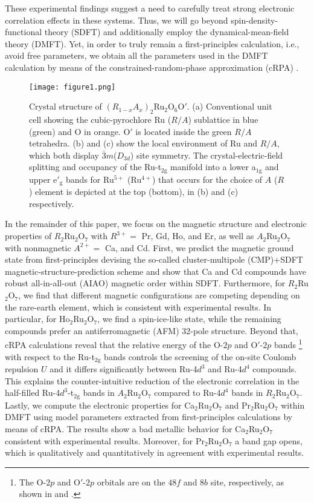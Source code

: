 \documentclass[10pt]{iopart}
\newcommand{\ttwog}{t$_{2\mathrm{g}}$ }
\begin{document}
These experimental findings suggest a need to carefully treat strong electronic correlation effects in these systems. Thus, we will go beyond spin-density-functional theory \cite{kubler2017theory} (SDFT) and additionally employ the dynamical-mean-field theory \cite{georges1996dynamical} (DMFT). Yet, in order to truly remain a first-principles calculation, i.e., avoid free parameters, we obtain all the parameters used in the DMFT calculation by means of the constrained-random-phase approximation (cRPA) \cite{aryasetiawan2004frequency}. 

\begin{figure}
  \texttt{[image: figure1.png]}
  \caption{Crystal structure of $(R_{1-x}A_x)_2$Ru$_2$O$_6$O$'$. (a) Conventional unit cell showing the cubic-pyrochlore Ru ($R/A$) sublattice in blue (green) and O in orange. $\mathrm{O}'$ is located inside the green $R/A$ tetrahedra. (b) and (c) show the local environment of Ru and $R/A$, which both display $\bar{3}m$($D_{3d}$) site symmetry. The crystal-electric-field splitting and occupancy of the Ru-t$_{2\mathrm{g}}$ manifold into a lower a$_{1\mathrm{g}}$ and upper e$'_\mathrm{g}$ bands for Ru$^{5+}$ (Ru$^{4+}$) that occurs for the choice of $A$ ($R$) element is depicted at the top (bottom), in (b) and (c) respectively.
  \label{fig:1}
  }
\end{figure}

In the remainder of this paper, we focus on the magnetic structure and electronic properties of $R_2$Ru$_2$O$_7$ with $R^{3+}=$ Pr, Gd, Ho, and Er, as well as $A_2$Ru$_2$O$_7$ with nonmagnetic $A^{2+}=$ Ca, and Cd.  
First, we predict the magnetic ground state from first-principles devising the so-called cluster-multipole (CMP)+SDFT magnetic-structure-prediction scheme \cite{huebsch2021benchmark} and show that Ca and Cd compounds have robust all-in-all-out (AIAO) magnetic order within SDFT. Furthermore, for $R_2$Ru$_2$O$_7$, we find that different magnetic configurations are competing depending on the rare-earth element, which is consistent with experimental results. In particular, for Ho$_2$Ru$_2$O$_7$, we find a spin-ice-like state, while the remaining compounds prefer an antiferromagnetic (AFM) 32-pole structure.
Beyond that, cRPA calculations reveal that the relative energy of the O-$2p$ and O$'$-$2p$ bands \footnote{The O-$2p$ and O$'$-$2p$ orbitals are on the $48f$ and $8b$ site, respectively, as shown in  and .} with respect to the Ru-\ttwog bands controls the screening of the on-site Coulomb repulsion $U$ and it differs significantly between Ru-4$d^3$ and Ru-4$d^4$ compounds. This explains the counter-intuitive reduction of the electronic correlation in the half-filled Ru-4$d^3$-\ttwog bands in $A_2$Ru$_2$O$_7$ compared to Ru-4$d^4$ bands in $R_2$Ru$_2$O$_7$. 
Lastly, we compute the electronic properties for Ca$_2$Ru$_2$O$_7$ and Pr$_2$Ru$_2$O$_7$ within DMFT using model parameters extracted from first-principles calculations by means of cRPA. The results show a bad metallic behavior for Ca$_2$Ru$_2$O$_7$ consistent with experimental results. Moreover, for Pr$_2$Ru$_2$O$_7$ a band gap opens, which is qualitatively and quantitatively in agreement with experimental results. 
\end{document}
